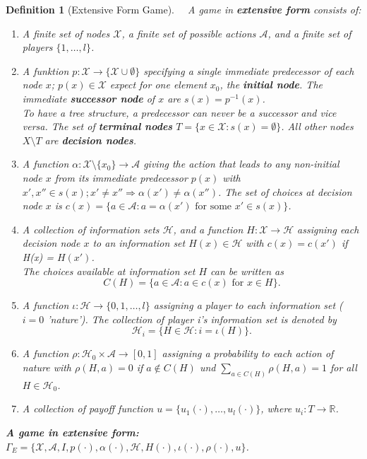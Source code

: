 \documentclass[12pt]{extreport} %
\newcommand{\R}{\mathbb{R}}
\theoremstyle{named}
\theoremstyle{itshape}
\newtheorem*{definition}{Definition}
\theoremstyle{normal}
\begin{document}
\begin{definition}[Extensive Form Game] ~\
	A game in \textbf{extensive form} consists of:
	\begin{enumerate}[label=(\roman*\upshape)]
		\item A finite set of nodes $\mathcal{X}$, a finite set of possible actions $\mathcal{A}$, and a finite set of players $\{1, \dotsc, l\}$.
		\item A funktion $p \colon \mathcal{X} \rightarrow \{ \mathcal{X} \cup \emptyset \}$ specifying a single immediate predecessor of each node $x$; $p(x) \in \mathcal{X}$ expect for one element $x_{0}$, the \textbf{initial node}. The immediate \textbf{successor node} of $x$ are $s(x) = p^{-1}(x)$. ~\\
			To have a tree structure, a predecessor can never be a successor and vice versa. The set of \textbf{terminal nodes} $T = \{ x \in \mathcal{X} \colon s(x) = \emptyset \}$. All other nodes $X \setminus T$ are \textbf{decision nodes}.
		\item A function $\alpha \colon \mathcal{X} \setminus \{ x_{0} \} \rightarrow \mathcal{A}$ giving the action that leads to any non-initial node $x$ from its immediate predecessor $p(x)$ with $x', x'' \in s(x); x' \neq x'' \Rightarrow \alpha(x') \neq \alpha(x'')$. The set of choices at decision node $x$ is $c(x) = \{ a \in \mathcal{A} \colon a = \alpha(x') \text{ for some } x' \in s(x) \}$.
		\item A collection of information sets $\mathcal{H}$, and a function $H \colon \mathcal{X} \rightarrow \mathcal{H}$ assigning each decision node $x$ to an information set $H(x) \in \mathcal{H}$ with $c(x) = c(x')$ if H(x) = $H(x')$. ~\\
			The choices available at information set $H$ can be written as
			$$ C(H) = \{ a \in \mathcal{A} \colon a \in c(x) \text{ for } x \in H \}. $$
		\item A function $\iota \colon \mathcal{H} \rightarrow \{ 0, 1, \dotsc, l \}$ assigning a player to each information set ($i = 0$ 'nature'). The collection of player i's information set is denoted by
			$$ \mathcal{H}_i = \{ H \in \mathcal{H} \colon i = \iota(H) \}. $$
		\item A function $\rho \colon \mathcal{H}_0 \times \mathcal{A} \rightarrow [0,1]$ assigning a probability to each action of nature with $\rho(H,a) = 0$ if $a \notin C(H)$ und $\sum_{a \in C(H)} \rho(H, a) = 1$ for all $H \in \mathcal{H}_{0}$.
		\item A collection of payoff function $u = \{ u_1(\cdot), \dotsc, u_l(\cdot) \}$, where $u_i \colon T \rightarrow \R$.
	\end{enumerate}
	\textbf{A game in extensive form:} $\Gamma_E = \{ \mathcal{X}, \mathcal{A}, I, p(\cdot), \alpha(\cdot), \mathcal{H}, H(\cdot), \iota(\cdot), \rho(\cdot), u \}$.
\end{definition}
\end{document}

